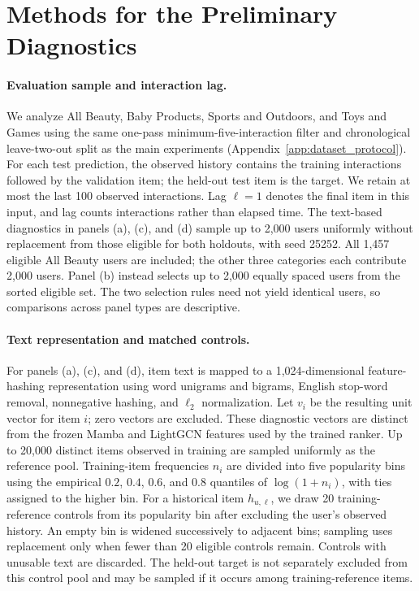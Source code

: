\documentclass[11pt]{article}
\begin{document}
\section{Methods for the Preliminary Diagnostics}
\label{app:preliminary_diagnostics}

\paragraph{Evaluation sample and interaction lag.}
We analyze All Beauty, Baby Products, Sports and Outdoors, and Toys and Games using the same one-pass minimum-five-interaction filter and chronological leave-two-out split as the main experiments (Appendix~\ref{app:dataset_protocol}). For each test prediction, the observed history contains the training interactions followed by the validation item; the held-out test item is the target. We retain at most the last 100 observed interactions. Lag $\ell=1$ denotes the final item in this input, and lag counts interactions rather than elapsed time. The text-based diagnostics in panels (a), (c), and (d) sample up to 2,000 users uniformly without replacement from those eligible for both holdouts, with seed 25252. All 1,457 eligible All Beauty users are included; the other three categories each contribute 2,000 users. Panel (b) instead selects up to 2,000 equally spaced users from the sorted eligible set. The two selection rules need not yield identical users, so comparisons across panel types are descriptive.

\paragraph{Text representation and matched controls.}
For panels (a), (c), and (d), item text is mapped to a 1,024-dimensional feature-hashing representation using word unigrams and bigrams, English stop-word removal, nonnegative hashing, and $\ell_2$ normalization. Let $v_i$ be the resulting unit vector for item $i$; zero vectors are excluded. These diagnostic vectors are distinct from the frozen Mamba and LightGCN features used by the trained ranker. Up to 20,000 distinct items observed in training are sampled uniformly as the reference pool. Training-item frequencies $n_i$ are divided into five popularity bins using the empirical $0.2$, $0.4$, $0.6$, and $0.8$ quantiles of $\log(1+n_i)$, with ties assigned to the higher bin. For a historical item $h_{u,\ell}$, we draw 20 training-reference controls from its popularity bin after excluding the user's observed history. An empty bin is widened successively to adjacent bins; sampling uses replacement only when fewer than 20 eligible controls remain. Controls with unusable text are discarded. The held-out target is not separately excluded from this control pool and may be sampled if it occurs among training-reference items.
\end{document}
